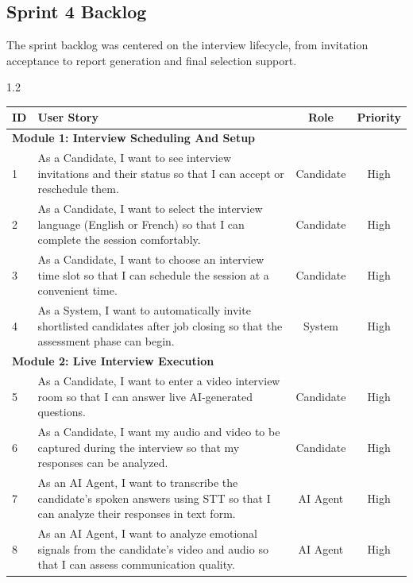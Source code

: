 \subsection{Sprint 4 Backlog}
\label{sec:sprint4:backlog}

The sprint backlog was centered on the interview lifecycle, from invitation acceptance to report generation and final selection support.

\begin{spacing}{1.2}
\begin{center}
\label{tab:sprint4_backlog}
\begin{tabularx}{\textwidth}{|l|X|c|c|}
\hline
\rowcolor{gray!20} \textbf{ID} & \textbf{User Story} & \textbf{Role} & \textbf{Priority} \\ \hline

\multicolumn{4}{|l|}{\cellcolor{gray!10}\textbf{Module 1: Interview Scheduling And Setup}} \\ \hline
1 & As a Candidate, I want to see interview invitations and their status so that I can accept or reschedule them. & Candidate & High \\ \hline
2 & As a Candidate, I want to select the interview language (English or French) so that I can complete the session comfortably. & Candidate & High \\ \hline
3 & As a Candidate, I want to choose an interview time slot so that I can schedule the session at a convenient time. & Candidate & High \\ \hline
4 & As a System, I want to automatically invite shortlisted candidates after job closing so that the assessment phase can begin. & System & High \\ \hline

\multicolumn{4}{|l|}{\cellcolor{gray!10}\textbf{Module 2: Live Interview Execution}} \\ \hline
5 & As a Candidate, I want to enter a video interview room so that I can answer live AI-generated questions. & Candidate & High \\ \hline
6 & As a Candidate, I want my audio and video to be captured during the interview so that my responses can be analyzed. & Candidate & High \\ \hline
7 & As an AI Agent, I want to transcribe the candidate's spoken answers using STT so that I can analyze their responses in text form. & AI Agent & High \\ \hline
8 & As an AI Agent, I want to analyze emotional signals from the candidate's video and audio so that I can assess communication quality. & AI Agent & High \\ \hline


\end{tabularx}
\end{center}
\end{spacing}
